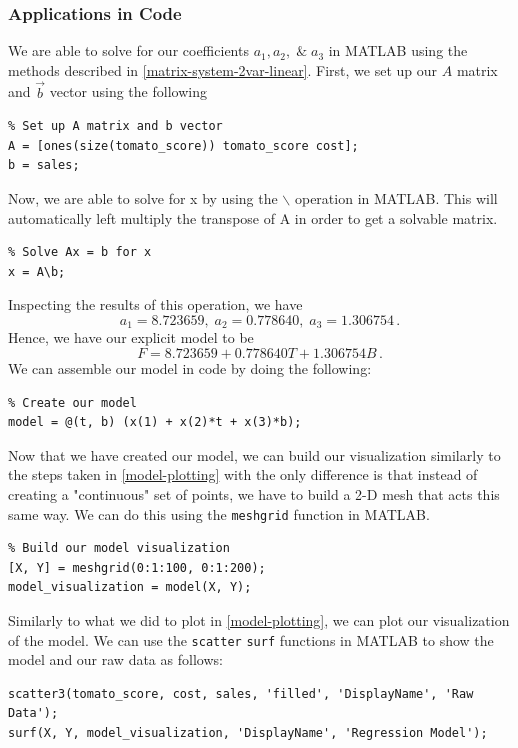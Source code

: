 \documentclass[11pt]{article}
\begin{document}
\subsubsection{Applications in Code}
\label{model-code-linear-2-variable}
We are able to solve for our coefficients $a_1, a_2, \; \& \; a_3$ in MATLAB using the methods described in \ref{matrix-system-2var-linear}. 
First, we set up our $A$ matrix and $\overrightarrow{b}$ vector using the following
\begin{lstlisting}
% Set up A matrix and b vector
A = [ones(size(tomato_score)) tomato_score cost];
b = sales;
\end{lstlisting}
Now, we are able to solve for x by using the $\backslash$ operation in MATLAB.  This will automatically left multiply the transpose of A in order to get a solvable matrix.
\begin{lstlisting}
% Solve Ax = b for x
x = A\b;
\end{lstlisting}
Inspecting the results of this operation, we have
\[a_1 = 8.723659, \; a_2 = 0.778640, \; a_3 = 1.306754 \, .\]
Hence, we have our explicit model to be
\[ F = 8.723659 + 0.778640 T + 1.306754 B \, .\]
We can assemble our model in code by doing the following:
\begin{lstlisting}
% Create our model
model = @(t, b) (x(1) + x(2)*t + x(3)*b);
\end{lstlisting}
Now that we have created our model, we can build our visualization similarly to the steps taken in \ref{model-plotting} with the only difference is that instead of creating a "continuous" set of points, we have to build a 2-D mesh that acts this same way.  
We can do this using the \texttt{meshgrid} function in MATLAB.
\begin{lstlisting}
% Build our model visualization
[X, Y] = meshgrid(0:1:100, 0:1:200);
model_visualization = model(X, Y);
\end{lstlisting}
Similarly to what we did to plot in \ref{model-plotting}, we can plot our visualization of the model.  
We can use the \texttt{scatter} \texttt{surf} functions in MATLAB to show the model and our raw data as follows:
\begin{lstlisting}
scatter3(tomato_score, cost, sales, 'filled', 'DisplayName', 'Raw Data');
surf(X, Y, model_visualization, 'DisplayName', 'Regression Model');
\end{lstlisting}

\newpage
\end{document}
